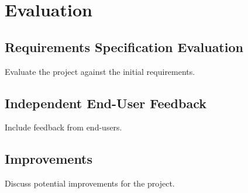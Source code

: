 \chapter{Evaluation}

\section{Requirements Specification Evaluation}
Evaluate the project against the initial requirements.

\section{Independent End-User Feedback}
Include feedback from end-users.

\section{Improvements}
Discuss potential improvements for the project.

